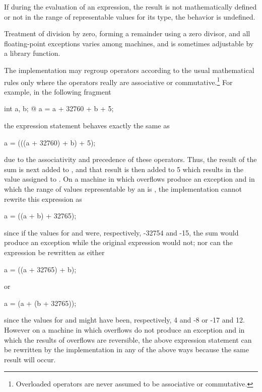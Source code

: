 \pnum
{}%
%
%
%
%
If during the evaluation of an expression, the result is not
mathematically defined or not in the range of representable values for
its type, the behavior is undefined.
\begin{note}
%
Treatment of division by zero, forming a remainder using a zero divisor,
and all floating-point exceptions varies among machines, and is sometimes
adjustable by a library function.
\end{note}

\pnum
{}%
%
\begin{note}
The implementation may regroup operators according to
the usual mathematical rules only
where the operators really are associative or commutative.\footnote{Overloaded
operators are never assumed to be associative or commutative.}
For example, in the following fragment
\begin{codeblock}
int a, b;
@\commentellip@
a = a + 32760 + b + 5;
\end{codeblock}
the expression statement behaves exactly the same as
\begin{codeblock}
a = (((a + 32760) + b) + 5);
\end{codeblock}
due to the associativity and precedence of these operators. Thus, the
result of the sum  is next added to , and
that result is then added to 5 which results in the value assigned to
. On a machine in which overflows produce an exception and in
which the range of values representable by an  is
, the implementation cannot rewrite this
expression as
\begin{codeblock}
a = ((a + b) + 32765);
\end{codeblock}
since if the values for  and  were, respectively,
-32754 and -15, the sum  would produce an exception while
the original expression would not; nor can the expression be rewritten
as either
\begin{codeblock}
a = ((a + 32765) + b);
\end{codeblock}
or
\begin{codeblock}
a = (a + (b + 32765));
\end{codeblock}
since the values for  and  might have been,
respectively, 4 and -8 or -17 and 12. However on a machine in which
overflows do not produce an exception and in which the results of
overflows are reversible, the above expression statement can be
rewritten by the implementation in any of the above ways because the
same result will occur.
\end{note}

